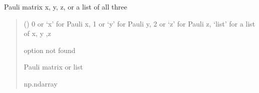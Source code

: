 \documentclass[letterpaper,10pt,english]{sphinxmanual}
\begin{document}
\begin{fulllineitems}
\label{\detokenize{spinbox:spinbox.core.pauli}}
\pysigstartsignatures
{}
\pysigstopsignatures
\sphinxAtStartPar
Pauli matrix x, y, z, or a list of all three
\begin{quote}\begin{description}
\sphinxAtStartPar
{} () \textendash{} 0 or ‘x’ for Pauli x, 1 or ‘y’ for Pauli y, 2 or ‘z’ for Pauli z, ‘list’ for a list of x, y ,z

\sphinxAtStartPar
{} \textendash{} option not found

\sphinxAtStartPar
Pauli matrix or list

\sphinxAtStartPar
np.ndarray

\end{description}\end{quote}

\end{fulllineitems}

\end{document}
